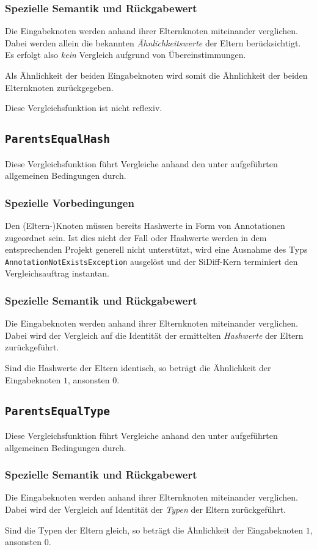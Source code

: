 \subsubsection*{Spezielle Semantik und Rückgabewert}
Die Eingabeknoten werden anhand ihrer Elternknoten miteinander verglichen. Dabei werden allein die bekannten \emph{Ähnlichkeitswerte} der Eltern berücksichtigt. Es erfolgt also \emph{kein} Vergleich aufgrund von Übereinstimmungen.

Als Ähnlichkeit der beiden Eingabeknoten wird somit die Ähnlichkeit der beiden Elternknoten zurückgegeben.

 Diese Vergleichsfunktion ist nicht reflexiv.


%
%
\subsection{\texttt{ParentsEqualHash}}
Diese Vergleichsfunktion führt Vergleiche anhand den unter  aufgeführten allgemeinen Bedingungen durch.

\subsubsection*{Spezielle Vorbedingungen}
Den (Eltern-)Knoten müssen bereits Hashwerte in Form von Annotationen zugeordnet sein. Ist dies nicht der Fall oder Hashwerte werden in dem entsprechenden Projekt generell nicht unterstützt, wird eine Ausnahme des Typs \texttt{AnnotationNotExistsException} ausgelöst und der SiDiff-Kern terminiert den Vergleichsauftrag instantan.

\subsubsection*{Spezielle Semantik und Rückgabewert}
Die Eingabeknoten werden anhand ihrer Elternknoten miteinander verglichen. Dabei wird der Vergleich auf die Identität der ermittelten \emph{Hashwerte} der Eltern zurückgeführt.

Sind die Hashwerte der Eltern identisch, so beträgt die Ähnlichkeit der Eingabeknoten $1$, ansonsten $0$.


%
%
\subsection{\texttt{ParentsEqualType}}
Diese Vergleichsfunktion führt Vergleiche anhand den unter  aufgeführten allgemeinen Bedingungen durch.

\subsubsection*{Spezielle Semantik und Rückgabewert}
Die Eingabeknoten werden anhand ihrer Elternknoten miteinander verglichen. Dabei wird der Vergleich auf Identität der \emph{Typen} der Eltern zurückgeführt.

Sind die Typen der Eltern gleich, so beträgt die Ähnlichkeit der Eingabeknoten $1$, ansonsten $0$.
